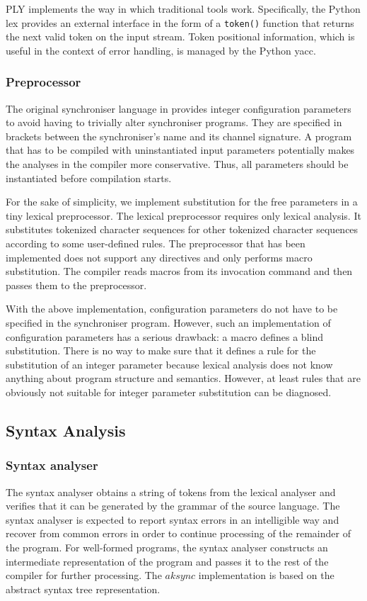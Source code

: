 PLY implements the way in which traditional tools work. Specifically, the Python lex provides an external interface in the form of a \texttt{token()} function that returns the next valid token on the input stream. Token positional information, which is useful in the context of error handling, is managed by the Python yacc.

  \subsubsection*{Preprocessor}
The original synchroniser language in \cite{astrakahn} provides integer configuration parameters to avoid having to trivially alter synchroniser programs. They are specified in brackets between the synchroniser's name and its channel signature. A program that has to be compiled with uninstantiated input parameters potentially makes the analyses in the compiler more conservative. Thus, all parameters should be instantiated before compilation starts.

For the sake of simplicity, we implement substitution for the free parameters in a tiny lexical preprocessor. The lexical preprocessor requires only lexical analysis. It substitutes tokenized character sequences for other tokenized character sequences according to some user-defined rules. The preprocessor that has been implemented does not support any directives and only performs macro substitution. The compiler reads macros from its invocation command and then passes them to the preprocessor.

With the above implementation, configuration parameters do not have to be specified in the synchroniser program. However, such an implementation of configuration parameters has a serious drawback: a macro defines a blind substitution. There is no way to make sure that it defines a rule for the substitution of an integer parameter because lexical analysis does not know anything about program structure and semantics. However, at least rules that are obviously not suitable for integer parameter substitution can be diagnosed.


\subsection{Syntax Analysis}
  \subsubsection*{Syntax analyser}
The syntax analyser obtains a string of tokens from the lexical analyser and verifies that it can be generated by the grammar of the source language. The syntax analyser is expected to report syntax errors in an intelligible way and recover from common errors in order to continue processing of the remainder of the program. For well-formed programs, the syntax analyser constructs an intermediate representation of the program and passes it to the rest of the compiler for further processing. The $aksync$ implementation is based on the abstract syntax tree representation.

